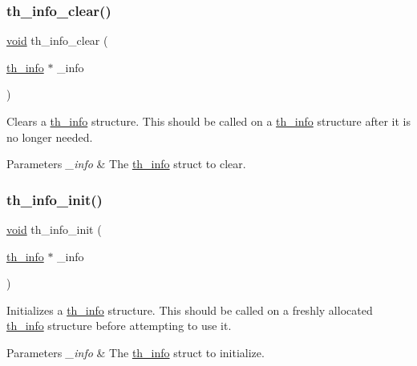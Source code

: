 \subsubsection{\texorpdfstring{th\+\_\+info\+\_\+clear()}{th\_info\_clear()}}
{\footnotesize\ttfamily \hyperlink{png_8h_ac9c84fa68bbad002983e35ce3663c686}{void} th\+\_\+info\+\_\+clear (\begin{DoxyParamCaption}\item[{\hyperlink{structth__info}{th\+\_\+info} $\ast$}]{\+\_\+info }\end{DoxyParamCaption})}

Clears a \hyperlink{structth__info}{th\+\_\+info} structure. This should be called on a \hyperlink{structth__info}{th\+\_\+info} structure after it is no longer needed. 
\begin{DoxyParams}{Parameters}
{\em \+\_\+info} & The \hyperlink{structth__info}{th\+\_\+info} struct to clear. \\
\hline
\end{DoxyParams}
\mbox{\label{group__basefuncs_ga430d9c605816a6ca0bdce3a0b965b926}} 
\subsubsection{\texorpdfstring{th\+\_\+info\+\_\+init()}{th\_info\_init()}}
{\footnotesize\ttfamily \hyperlink{png_8h_ac9c84fa68bbad002983e35ce3663c686}{void} th\+\_\+info\+\_\+init (\begin{DoxyParamCaption}\item[{\hyperlink{structth__info}{th\+\_\+info} $\ast$}]{\+\_\+info }\end{DoxyParamCaption})}

Initializes a \hyperlink{structth__info}{th\+\_\+info} structure. This should be called on a freshly allocated \hyperlink{structth__info}{th\+\_\+info} structure before attempting to use it. 
\begin{DoxyParams}{Parameters}
{\em \+\_\+info} & The \hyperlink{structth__info}{th\+\_\+info} struct to initialize. \\
\hline
\end{DoxyParams}
\mbox{\label{group__basefuncs_ga02f3f38261a9b39452d8a5e6f8737cc1}} 

